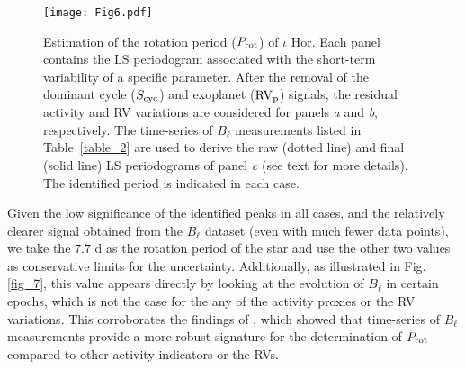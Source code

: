 \documentclass[a4paper,fleqn,usenatbib]{mnras}
\begin{document}


\begin{figure} %
\texttt{[image: Fig6.pdf]}
\caption{Estimation of the rotation period ($P_{\rm rot}$) of $\iota$ Hor. Each panel contains the LS periodogram associated with the short-term variability of a specific parameter. After the removal of the dominant cycle ($S_{\rm cyc}$) and exoplanet (${\rm RV}_{\rm p}$) signals, the residual activity and RV variations are considered for panels \textit{a} and \textit{b}, respectively. The time-series of $B_{\ell}$ measurements listed in Table~\ref{table_2} are used to derive the raw (dotted line) and final (solid line) LS periodograms of panel \textit{c} (see text for more details). The identified period is indicated in each case.}\label{fig_6}
\end{figure}


Given the low significance of the identified peaks in all cases, and the relatively clearer signal obtained from the $B_{\ell}$ dataset (even with much fewer data points), we take the $7.7$ d as the rotation period of the star and use the other two values as conservative limits for the uncertainty. Additionally, as illustrated in Fig. \ref{fig_7}, this value appears directly by looking at the evolution of $B_{\ell}$ in certain epochs, which is not the case for the any of the activity proxies or the RV variations. This corroborates the findings of , which showed that time-series of $B_{\ell}$ measurements provide a more robust signature for the determination of $P_{\rm rot}$ compared to other activity indicators or the RVs. %
\end{document}
